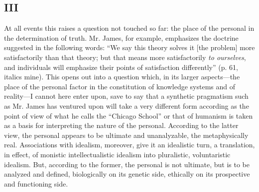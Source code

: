 \documentclass[12pt]{article}
\begin{document}
\subsection*{III}
At all events this raises a question not touched so far: the place of
the personal in the determination of truth. Mr. James, for example,
emphasizes the doctrine suggested in the following words: ``We say this
theory solves it [the problem] more satisfactorily than that theory;
but that means more satisfactorily \emph{to ourselves}, and individuals
will emphasize their points of satisfaction differently'' (p. 61,
italics mine). This opens out into a question which, in its larger
aspects---the place of the personal factor in the constitution of
knowledge systems and of reality---I cannot here enter upon, save to
say that a synthetic pragmatism such as Mr. James has ventured upon
will take a very different form according as the point of view of what
he calls the ``Chicago School'' or that of humanism is taken as a basis
for interpreting the nature of the personal. According to the latter
view, the personal appears to be ultimate and unanalyzable, the
metaphysically real. Associations with idealism, moreover, give it an
idealistic turn, a translation, in effect, of monistic
intellectualistic idealism into pluralistic, voluntaristic idealism.
But, according to the former, the personal is not ultimate, but is to
be analyzed and defined, biologically on its genetic side, ethically
on its prospective and functioning side.
\end{document}
